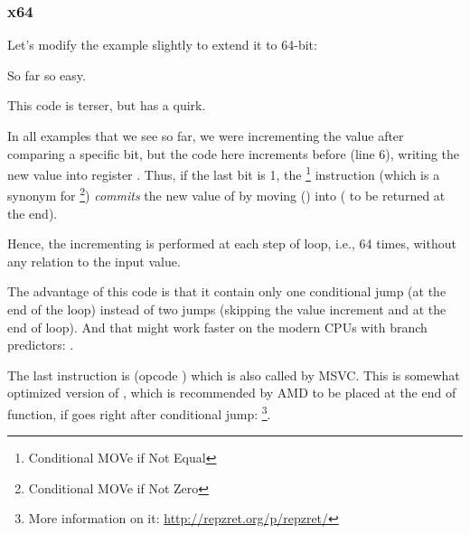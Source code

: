 \subsubsection{x64}
\label{subsec:popcnt}

Let's modify the example slightly to extend it to 64-bit:




So far so easy.






This code is terser, but has a quirk.

In all examples that we see so far, we were incrementing the  value after comparing a specific bit,
but the code here increments  before (line 6), writing the new value into register \EDX .
Thus, if the last bit is 1, the \CMOVNE\footnote{Conditional MOVe if Not Equal} instruction
(which is a synonym for \CMOVNZ\footnote{Conditional MOVe if Not Zero}) \emph{commits} 
the new value of 
by moving \EDX () into \EAX ( to be returned at the end).

Hence, the incrementing is performed at each step of loop, i.e., 64 times, without any relation to the input value.

The advantage of this code is that it contain only one conditional jump (at the end of the loop) instead of 
two jumps (skipping the  value increment and at the end of loop).
And that might work faster on the modern CPUs with branch predictors: .

\label{FATRET}
The last instruction is  (opcode ) 
which is also called  by MSVC.
This is somewhat optimized version of \RET, 
which is recommended by AMD to be placed at the end of function, if \RET goes right after conditional jump: 
\footnote{More information on it: \url{http://repzret.org/p/repzret/}}.

